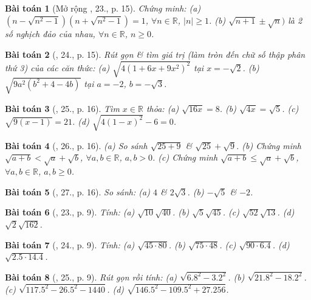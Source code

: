\documentclass{article}
\newtheorem{baitoan}{Bài toán}
\begin{document}
\begin{baitoan}[Mở rộng \cite{SGK_Toan_9_tap_1}, 23., p. 15]
	Chứng minh: (a) $(n - \sqrt{n^2 - 1})(n + \sqrt{n^2 - 1}) = 1$, $\forall n\in\mathbb{R}$, $|n|\ge1$. (b) $\sqrt{n + 1}\pm\sqrt{n})$ là 2 số nghịch đảo của nhau, $\forall n\in\mathbb{R}$, $n\ge0$.
\end{baitoan}

\begin{baitoan}[\cite{SGK_Toan_9_tap_1}, 24., p. 15]
	Rút gọn \& tìm giá trị (làm tròn đến chữ số thập phân thứ 3) của các căn thức: (a) $\sqrt{4(1 + 6x + 9x^2)^2}$ tại $x = -\sqrt{2}$. (b) $\sqrt{9a^2(b^2 + 4 - 4b)}$ tại $a = -2$, $b = -\sqrt{3}$. 
\end{baitoan}

\begin{baitoan}[\cite{SGK_Toan_9_tap_1}, 25., p. 16]
	Tìm $x\in\mathbb{R}$ thỏa: (a) $\sqrt{16x} = 8$. (b) $\sqrt{4x} = \sqrt{5}$. (c) $\sqrt{9(x - 1)} = 21$. (d) $\sqrt{4(1 - x)^2} - 6 = 0$.
\end{baitoan}

\begin{baitoan}[\cite{SGK_Toan_9_tap_1}, 26., p. 16]
	(a) So sánh $\sqrt{25 + 9}$ \& $\sqrt{25} + \sqrt{9}$. (b) Chứng minh $\sqrt{a + b} < \sqrt{a} + \sqrt{b}$, $\forall a,b\in\mathbb{R}$, $a,b > 0$. (c) Chứng minh $\sqrt{a + b}\le\sqrt{a} + \sqrt{b}$, $\forall a,b\in\mathbb{R}$, $a,b\ge0$.
\end{baitoan}

\begin{baitoan}[\cite{SGK_Toan_9_tap_1}, 27., p. 16]
	So sánh: (a) $4$ \& $2\sqrt{3}$. (b) $-\sqrt{5}$ \& $-2$.
\end{baitoan}

\begin{baitoan}[\cite{SBT_Toan_9_tap_1}, 23., p. 9]
	Tính: (a) $\sqrt{10}\sqrt{40}$. (b) $\sqrt{5}\sqrt{45}$. (c) $\sqrt{52}\sqrt{13}$. (d) $\sqrt{2}\sqrt{162}$.
\end{baitoan}

\begin{baitoan}[\cite{SBT_Toan_9_tap_1}, 24., p. 9]
	Tính: (a) $\sqrt{45\cdot80}$. (b) $\sqrt{75\cdot48}$. (c) $\sqrt{90\cdot6.4}$. (d) $\sqrt{2.5\cdot14.4}$.
\end{baitoan}

\begin{baitoan}[\cite{SBT_Toan_9_tap_1}, 25., p. 9]
	Rút gọn rồi tính: (a) $\sqrt{6.8^2 - 3.2^2}$. (b) $\sqrt{21.8^2 - 18.2^2}$. (c) $\sqrt{117.5^2 - 26.5^2 - 1440}$.  (d) $\sqrt{146.5^2 - 109.5^2 + 27.256}$.
\end{baitoan}
\end{document}
